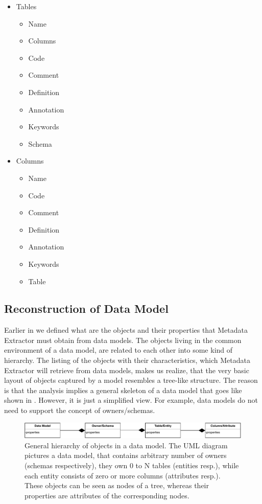 \begin{itemize}
	\item Tables
	\begin{itemize}
		\item Name 
		\item Columns
		\item Code 
		\item Comment
		\item Definition
		\item Annotation
		\item Keywords
		\item Schema
	\end{itemize}
	\item Columns
	\begin{itemize}
		\item Name 
		\item Code 
		\item Comment
		\item Definition
		\item Annotation
		\item Keywords
		\item Table
	\end{itemize}
\end{itemize}

\subsection{Reconstruction of Data Model}

Earlier in  we defined what are the objects and their properties that Metadata Extractor must obtain from data models.
The objects living in the common environment of a data model, are related to each other into some kind of hierarchy.
The listing of the objects with their characteristics, which Metadata Extractor will retrieve from data models, makes us realize, that the very basic layout of objects captured by a model resembles a tree-like structure.
The reason is that the analysis implies a general skeleton of a data model that goes like shown in . However, it is just a simplified view. For example, data models do not need to support the concept of owners/schemas.

\begin{figure}[H]
	\centering
	\includegraphics[width=14cm]{../img/DataModelHierarchy}
	\caption[Hierarchy of Objects in a Data Model]{General hierarchy of objects in a data model. The UML diagram pictures a data model, that contains arbitrary number of owners (schemas respectively), they own 0 to N tables (entities resp.), while each entity consists of zero or more columns (attributes resp.). These objects can be seen as nodes of a tree, whereas their properties are attributes of the corresponding nodes.}
	\label{DataModelHierarchy}
\end{figure} 

